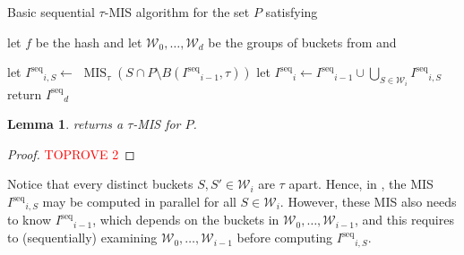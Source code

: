 \documentclass[11pt,letterpaper]{article}
\theoremstyle{plain}
\newtheorem{lemma}[theorem]{Lemma}
\theoremstyle{definition}
\theoremstyle{remark}
\DeclareMathOperator{\MIS}{MIS}
\newcommand{\Iseq}{\ensuremath{I^{\mathrm{seq}}}\xspace}
\begin{document}
\begin{algorithm}
\caption{Basic sequential $\tau$-MIS algorithm for the set $P$ satisfying }
\label{alg:seq_MIS}
\begin{algorithmic}[1]


    \State let $f$ be the hash and let $\mathcal{W}_0, \ldots, \mathcal{W}_d$ be the groups of buckets from  and 
    
      
    \State let $\Iseq_{i, S} \gets$ $\MIS_\tau(S \cap P \setminus B(\Iseq_{i - 1}, \tau))$
    \label{line:Iseq_MIS_def}
    \Comment{define $\Iseq_{-1} \gets \emptyset$}
    \EndFor
    \State let $\Iseq_i \gets \Iseq_{i - 1} \cup \bigcup_{S \in \mathcal{W}_i}\Iseq_{i, S}$
    \label{line:Iseq_i_def}
    \EndFor
    \State return $\Iseq_d$
    \label{line:Iseq_d_def}
\end{algorithmic}
\end{algorithm}



















\begin{lemma}
\label{lemma:seq_MIS_correctness}
     returns a $\tau$-MIS for $P$. 
\end{lemma}
\begin{proof}\textcolor{red}{TOPROVE 2}\end{proof}
















Notice that every distinct buckets $S, S' \in \mathcal{W}_i$ are $\tau$ apart.
Hence, in , the MIS $\Iseq_{i,S}$ may be computed in parallel for all $S \in \mathcal{W}_i$.
However, these MIS also needs to know $\Iseq_{i - 1}$, which depends on the buckets in $\mathcal{W}_0, \ldots, \mathcal{W}_{i - 1}$,
and this requires to (sequentially) examining $\mathcal{W}_0, \ldots, \mathcal{W}_{i - 1}$ before computing $\Iseq_{i ,S}$.
\end{document}
